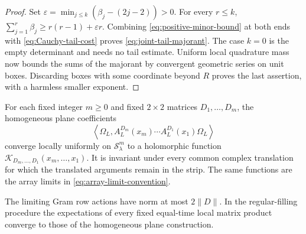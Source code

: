 \begin{proof}
Set $\varepsilon=\min_{j\le k}(\beta_j-(2j-2))>0$.
For every $r\le k$,
$\sum_{j=1}^r\beta_j\ge r(r-1)+\varepsilon r$.
Combining \eqref{eq:positive-minor-bound} at both ends with
\eqref{eq:Cauchy-tail-cost} proves
\eqref{eq:joint-tail-majorant}.  The case $k=0$ is the empty
determinant and needs no tail estimate.
Uniform local quadrature mass now bounds the sums of the
majorant by convergent geometric series on unit boxes.
Discarding boxes with some coordinate beyond $R$ proves the
last assertion, with a harmless smaller exponent.
\end{proof}

\begin{proposition}\label{prop:word-kernel}
For each fixed integer $m\ge0$ and fixed $2\times2$ matrices
$D_1,\ldots,D_m$, the homogeneous plane coefficients
\begin{equation}\label{eq:word-kernel-definition}
 \left\langle\Omega_L,
     A_L^{D_m}(x_m)\cdots A_L^{D_1}(x_1)\Omega_L\right\rangle
\end{equation}
converge locally uniformly on $\mathcal S_\lambda^m$ to a
holomorphic function
$\mathcal K_{D_m,\ldots,D_1}(x_m,\ldots,x_1)$.
It is invariant under every common complex translation for which
the translated arguments remain in the strip.
The same functions are the array limits in
\eqref{eq:array-limit-convention}.

The limiting Gram row actions have norm at most $2\|D\|$.
In the regular-filling procedure the expectations of every fixed
equal-time local matrix product converge to those of the
homogeneous plane construction.
\end{proposition}

